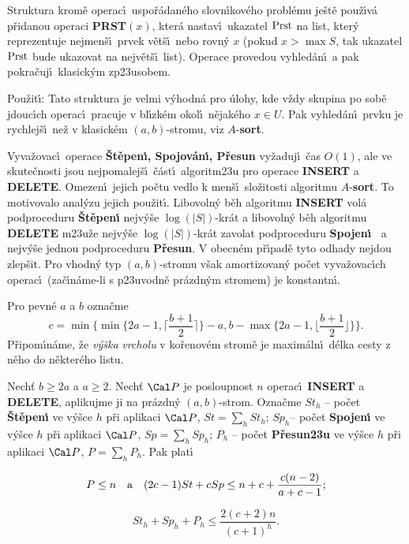 \flushpar Struktura krom\v e operac\'\i\ uspo\v r\'adan\'eho 
slovn\'\i kov\'eho prob\-l\'e\-mu 
je\v st\v e pou\v z\'\i v\'a p\v ridanou ope\-raci {\bf PRST$(x)$}, kter\'a nastav\'\i\ ukazatel 
$\operatorname{Prst}$ na list, kter\'y reprezentuje nejmen\v s\'\i\ prvek v\v et\v s\'\i\ 
nebo rovn\'y $x$ (pokud $x>\max S$, tak ukazatel $\operatorname{Prst}$ bude 
ukazovat na nejv\v et\v s\'\i\ list). Operace provedou vyhled\'an\'\i\ a 
pak pokra\v cuj\'\i\ klasick\'ym zp\accent23usobem.
\medskip

\flushpar Pou\v zit\'\i : Tato struktura je velmi v\'yhodn\'a pro 
\'ulohy, kde v\v zdy skupina po sob\v e jdouc\'\i ch ope\-rac\'\i\  
pracuje v bl\'\i zk\'em okol\'\i\ n\v eja\-k\'e\-ho $x\in U$. Pak 
vyhled\'an\'\i\ prvku je rychlej\v s\'\i\ ne\v z v klasick\'em 
$(a,b)$-stromu, viz $A$-{\bf sort}.
\medskip

\flushpar Vyva\v zovac\'\i\ operace {\bf \v St\v epen\'\i , Spojov\'an\'\i , P\v resun }
vy\v zaduj\'\i\ \v cas $O(1)$, ale ve skute\v cnosti jsou nejpomalej\v s\'\i\ 
\v c\'ast\'\i\ 
algoritm\accent23u pro operace {\bf INSERT} a {\bf DELETE}.  Omezen\'\i\ 
jejich po\v ctu vedlo k men\v s\'\i\ slo\v zitosti algoritmu $A$-{\bf sort}.  To motivovalo anal\'yzu 
jejich pou\v zit\'\i .\newline 
Libovoln\'y b\v eh algoritmu {\bf INSERT }
vol\'a podproceduru {\bf \v St\v epe\-n\'\i} nejv\'y\v se $\log(|
S|)$-kr\'at a libovoln\'y b\v eh 
algoritmu  {\bf DELETE} m\accent23u\-\v ze nejv\'y\v se $\log(|S|
)$-kr\'at zavolat podproceduru 
{\bf Spojen\'\i\ }
a nejv\'y\v se jednou podproceduru {\bf P\v resun}.  V obecn\'em 
p\v r\'\i pad\v e tyto od\-ha\-dy nejdou zlep\v sit.  Pro vhodn\'y typ 
$(a,b)$-stromu v\v sak amortizovan\'y po\v cet vyva\v zovac\'\i ch 
ope\-rac\'\i\ (za\v c\'\i n\'ame-li s  
p\accent23u\-vod\-n\v e pr\'az\-dn\'ym stromem) je konstantn\'\i .
\medskip

\flushpar Pro pevn\'e $a$ a $b$ ozna\v cme 
$$c=\min\{\min\{2a-1,\lceil\frac {b+1}2\rceil \}-a,b-\max\{2a-1,\lfloor\frac {
b+1}2\rfloor \}\}.$$
P\v ripom\'\i n\'ame, \v ze \emph{v\'y\v ska} \emph{vrcholu} v ko\v renov\'em strom\v e je 
maxim\'aln\'\i\ d\'elka cesty z n\v eho do n\v ekter\'eho listu.
\medskip

\proclaim{V\v eta}Nech\v t $b\ge 2a$ a $a\ge 2$. Nech\v t $\Cal P$ je 
posloupnost $n$ operac\'\i\ {\bf INSERT} a {\bf DELETE}, aplikujme ji na 
pr\'azdn\'y $(a,b)$-strom. Ozna\v cme\newline 
$St_h$ -- po\v cet {\bf \v St\v epen\'\i} ve v\'y\v sce $h$ p\v ri aplikaci $
\Cal P$, $St=\sum_hSt_h$;\newline 
$Sp_h$-- po\v cet {\bf Spojen\'\i} ve v\'y\v sce $h$ p\v ri aplikaci $
\Cal P$, 
$Sp=\sum_hSp_h$;\newline 
$P_h$ -- po\v cet {\bf P\v resun\accent23u} ve v\'y\v sce $h$ p\v ri aplikaci $
\Cal P$, 
$P=\sum_hP_h$.\newline 
Pak plat\'\i
\roster
\item
$$P\le n\quad \text{\rm a}\quad (2c-1)St+cSp\le n+c+\frac {c(n-2)}{a+c-1};$$
\item
$$St_h+Sp_h+P_h\le\frac {2(c+2)n}{(c+1)^h}.$$
\endroster
\endproclaim


